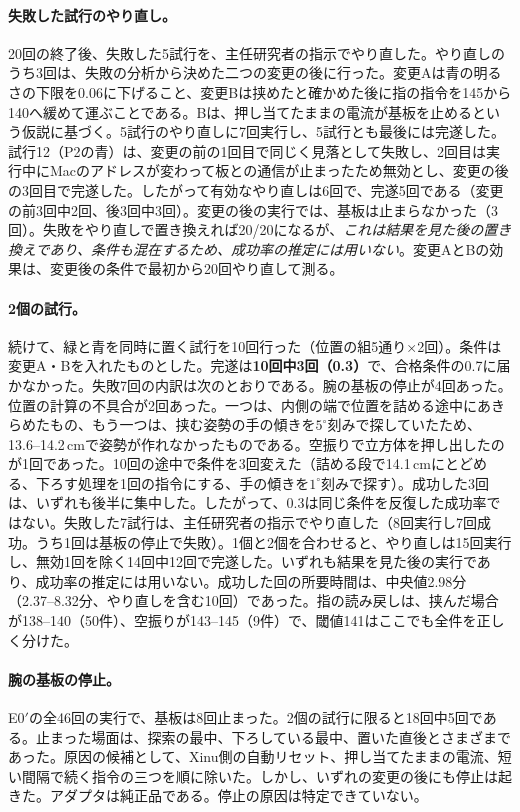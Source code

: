 \documentclass[10pt,letterpaper]{article}
\begin{document}
\paragraph{失敗した試行のやり直し。}20回の終了後、失敗した5試行を、主任研究者の指示でやり直した。やり直しのうち3回は、失敗の分析から決めた二つの変更の後に行った。変更Aは青の明るさの下限を0.06に下げること、変更Bは挟めたと確かめた後に指の指令を145から140へ緩めて運ぶことである。Bは、押し当てたままの電流が基板を止めるという仮説に基づく。5試行のやり直しに7回実行し、5試行とも最後には完遂した。試行12（P2の青）は、変更の前の1回目で同じく見落として失敗し、2回目は実行中にMacのアドレスが変わって板との通信が止まったため無効とし、変更の後の3回目で完遂した。したがって有効なやり直しは6回で、完遂5回である（変更の前3回中2回、後3回中3回）。変更の後の実行では、基板は止まらなかった（3回）。失敗をやり直しで置き換えれば20/20になるが、\emph{これは結果を見た後の置き換えであり、条件も混在するため、成功率の推定には用いない}。変更AとBの効果は、変更後の条件で最初から20回やり直して測る。

\paragraph{2個の試行。}続けて、緑と青を同時に置く試行を10回行った（位置の組5通り×2回）。条件は変更A・Bを入れたものとした。完遂は\textbf{10回中3回（0.3）}で、合格条件の0.7に届かなかった。失敗7回の内訳は次のとおりである。腕の基板の停止が4回あった。位置の計算の不具合が2回あった。一つは、内側の端で位置を詰める途中にあきらめたもの、もう一つは、挟む姿勢の手の傾きを$5^{\circ}$刻みで探していたため、13.6--14.2\,cmで姿勢が作れなかったものである。空振りで立方体を押し出したのが1回であった。10回の途中で条件を3回変えた（詰める段で14.1\,cmにとどめる、下ろす処理を1回の指令にする、手の傾きを$1^{\circ}$刻みで探す）。成功した3回は、いずれも後半に集中した。したがって、0.3は同じ条件を反復した成功率ではない。失敗した7試行は、主任研究者の指示でやり直した（8回実行し7回成功。うち1回は基板の停止で失敗）。1個と2個を合わせると、やり直しは15回実行し、無効1回を除く14回中12回で完遂した。いずれも結果を見た後の実行であり、成功率の推定には用いない。成功した回の所要時間は、中央値2.98分（2.37--8.32分、やり直しを含む10回）であった。指の読み戻しは、挟んだ場合が138--140（50件）、空振りが143--145（9件）で、閾値141はここでも全件を正しく分けた。

\paragraph{腕の基板の停止。}E0$'$の全46回の実行で、基板は8回止まった。2個の試行に限ると18回中5回である。止まった場面は、探索の最中、下ろしている最中、置いた直後とさまざまであった。原因の候補として、Xinu側の自動リセット、押し当てたままの電流、短い間隔で続く指令の三つを順に除いた。しかし、いずれの変更の後にも停止は起きた。アダプタは純正品である。停止の原因は特定できていない。
\end{document}
